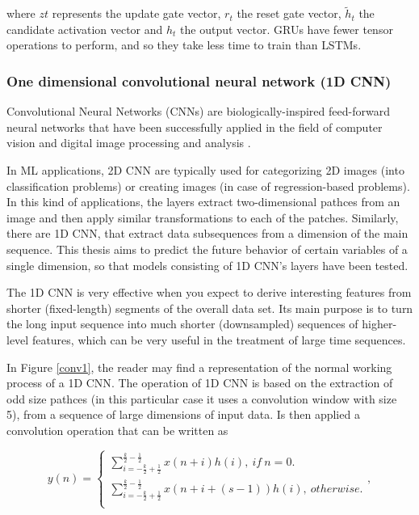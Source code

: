 where $zt$ represents the update gate vector, $r_t$ the reset gate vector, $\tilde{h}_t$ the candidate activation vector and $h_t$ the output vector. \ac{GRU}s have fewer tensor operations to perform, and so they take less time to train than \ac{LSTM}s.  

\subsubsection{One dimensional convolutional neural network (1D CNN)}\label{chap3:subsubsec:1dcnn}


Convolutional Neural Networks (\ac{CNN}s) are biologically-inspired feed-forward neural networks that have been successfully applied in the field of computer vision and digital image processing and analysis \cite{cnn0}.

In \ac{ML} applications, \ac{2D CNN} are typically used for categorizing 2D images (into classification problems) or creating images (in case of regression-based problems). In this kind of applications, the layers extract two-dimensional pathces from an image and then apply similar transformations to each of the patches. Similarly, there are \ac{1D CNN}, that extract data subsequences from a dimension of the main sequence. This thesis aims to predict the future behavior of certain variables of a single dimension, so that models consisting of \ac{1D CNN}'s layers have been tested.

The \ac{1D CNN} is very effective when you expect to derive interesting features from shorter (fixed-length) segments of the overall data set. Its main purpose is to turn the long input sequence into much shorter (downsampled) sequences of higher-level features, which can be very useful in the treatment of large time sequences.

In Figure \ref{conv1}, the reader may find a representation of the normal working process of a \ac{1D CNN}. The operation of \ac{1D CNN} is based on the extraction of odd size pathces (in this particular case it uses a convolution window with size 5), from a sequence of large dimensions of input data. Is then applied a convolution operation that can be written as \cite{cnn2} 

\begin{equation}
y(n)=
    \begin{cases} 
            
        \sum_{i=-\frac{k}{2}+\frac{1}{2}}^{\frac{k}{2}-\frac{1}{2}} x(n+i)h(i),\  if \  n=0.\\
        \sum_{i=-\frac{k}{2}+\frac{1}{2}}^{\frac{k}{2}-\frac{1}{2}} x(n+i+(s-1))h(i),\  otherwise.\\
    
    \end{cases} ,
\end{equation}

